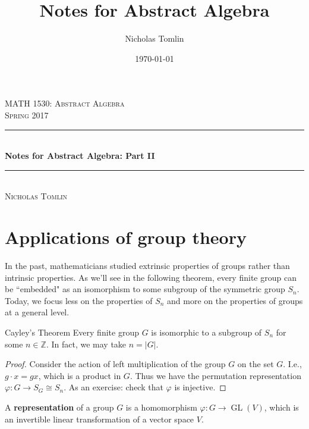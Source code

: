 \documentclass{article}
\title{Notes for Abstract Algebra}
\author{Nicholas Tomlin}
\date{\today}
\theoremstyle{plain}
\newcommand{\Z}{\mathbb{Z}}
\newcommand{\HRuleRed}{\textcolor{Maroon}{\rule{\linewidth}{0.5mm}}}
\newcommand{\on}[1]{\operatorname{#1}}
\begin{document}
\setcounter{page}{41}
\thispagestyle{empty}
\begin{center}
\textsc{\Large MATH 1530: Abstract Algebra}\\[0.4cm]
\textsc{\large Spring 2017}\\[0.2cm]

\HRuleRed\\[0.4cm]
{ \huge \bfseries Notes for Abstract Algebra: Part II}\\[0.1cm]
\HRuleRed\\[0.2cm]

\Large \textsc{Nicholas Tomlin}
\end{center}
\tableofcontents
\newpage

\section{Applications of group theory}
In the past, mathematicians studied extrinsic properties of groups rather than intrinsic properties. As we'll see in the following theorem, every finite group can be ``embedded" as an isomorphism to some subgroup of the symmetric group $S_n$. Today, we focus less on the properties of $S_n$ and more on the properties of groups at a general level.
\begin{theorem}{Cayley's Theorem}{}
Every finite group $G$ is isomorphic to a subgroup of $S_n$ for some $n\in\Z$. In fact, we may take $n = |G|$.
\end{theorem}
\begin{proof}
Consider the action of left multiplication of the group $G$ on the set $G$. I.e., $g\cdot x = gx$, which is a product in $G$. Thus we have the permutation representation $\varphi : G \to S_G \cong S_n$. As an exercise: check that $\varphi$ is injective.
\end{proof}
\begin{definition}{}{}
A \textbf{representation} of a group $G$ is a homomorphism $\varphi : G \to \on{GL}(V)$, which is an invertible linear transformation of a vector space $V$. %
\end{definition}
\end{document}
